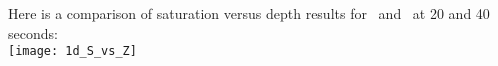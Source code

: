     Here is a comparison of saturation versus depth results for  \mfus\ and \hgs\ at 20 and 40 seconds:
    \vspace{.2in} \\
    \texttt{[image: 1d\_S\_vs\_Z]}
    \vspace{.2in} \\





